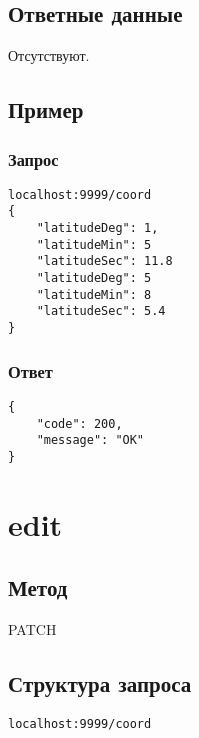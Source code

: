 \section*{Ответные данные}
Отсутствуют.

\section*{Пример}

\subsection*{Запрос}

\begin{lstlisting}
localhost:9999/coord
{
    "latitudeDeg": 1,
    "latitudeMin": 5
    "latitudeSec": 11.8
    "latitudeDeg": 5
    "latitudeMin": 8
    "latitudeSec": 5.4
}
\end{lstlisting}
\hfill

\subsection*{Ответ}

\begin{lstlisting}
{
	"code": 200,
	"message": "OK"
}
\end{lstlisting}
\hfill


\chapter{edit}

\section*{Метод}
PATCH

\section*{Структура запроса}
\begin{lstlisting}
localhost:9999/coord
\end{lstlisting}
\hfill

